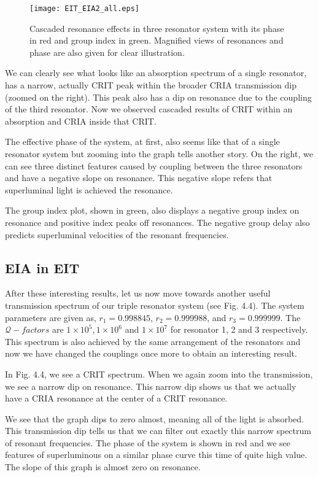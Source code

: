 \begin{figure}[h]
\centering
\texttt{[image: EIT\_EIA2\_all.eps]}
\caption{Cascaded resonance effects in three resonator system with its phase in red and group index in green. Magnified views of resonances and phase are also given for clear illustration.}
\end{figure}


We can clearly see what looks like an absorption spectrum of a single resonator, has a narrow, actually CRIT peak within the broader CRIA transmission dip (zoomed on the right). This peak also has a dip on resonance due to the coupling of the third resonator. Now we observed cascaded results of CRIT within an absorption and CRIA inside that CRIT. 

The effective phase of the system, at first, also seems like that of a single resonator system but zooming into the graph tells another story. On the right, we can see three distinct features caused by coupling between the three resonators and have a negative slope on resonance. This negative slope refers that superluminal light is achieved the resonance.

The group index plot, shown in green, also displays a negative group index on resonance and positive index peaks off resonances. The negative group delay also predicts superluminal velocities of the resonant frequencies.

\subsection{EIA in EIT}

After these interesting results, let us now move towards another useful transmission spectrum of our triple resonator system (see Fig. 4.4). The system parameters are given as, $r_{1} = 0.998845$, $r_{2} = 0.999988$, and $r_{3} = 0.999999$. The $\mathcal{Q}-factors$ are $1\times10^{5}, 1\times10^{6}$ and $1\times10^{7}$ for resonator 1, 2 and 3 respectively. This spectrum is also achieved by the same arrangement of the resonators and now we have changed the couplings once more to obtain an interesting result. 

In Fig. 4.4, we see a CRIT spectrum. When we again zoom into the transmission, we see a narrow dip on resonance. This narrow dip shows us that we actually have a CRIA resonance at the center of a CRIT resonance.

We see that the graph dips to zero almost, meaning all of the light is absorbed. This transmission dip tells us that we can filter out exactly this narrow spectrum of resonant frequencies. 
The phase of the system is shown in red and we see features of superluminous on a similar phase curve this time of quite high value. The slope of this graph is almost zero on resonance.

